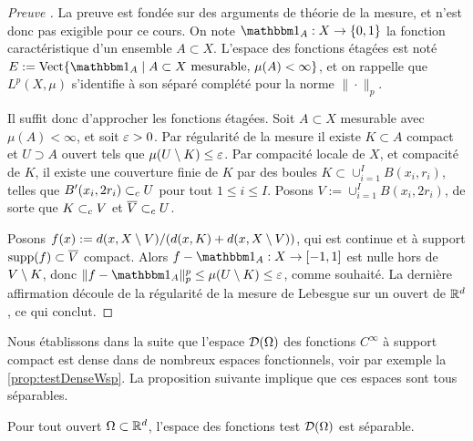 \begin{proof}[Preuve \facultatif] 
	La preuve est fondée sur des arguments de théorie de la mesure, et n'est donc pas exigible pour ce cours.
	On note $\bbone_A : X\to \{0,1\}$ la fonction caractéristique d'un ensemble $A\subset X$. 
	L'espace des fonctions étagées est noté $E := \Vect\{\bbone_A \mid A \subset X \text{ mesurable},\, \mu(A)<\infty \}$, et on rappelle que $L^p(X,\mu)$ s'identifie à son  séparé complété pour la norme $\|\cdot\|_p$. %
	
	Il suffit donc d'approcher les fonctions étagées.
	Soit $A \subset X$ mesurable avec $\mu(A) < \infty$, et soit $\varepsilon>0$. Par régularité de la mesure il existe $K \subset A$ compact et $U \supset A$ ouvert tels que $\mu(U\setminus K) \leq \varepsilon$. 
	Par compacité locale de $X$, et compacité de $K$, il existe une couverture finie de $K$ par des boules $K \subset \cup_{i=1}^I B(x_i,r_i)$, telles que $B'(x_i,2r_i)\subset_c U$ pour tout $1 \leq i \leq I$. Posons $V := \cup_{i=1}^I B(x_i,2r_i)$, de sorte que $K \subset_c V$ et $\overline V \subset_c U$.  
	
	
	Posons $f(x) := d(x,X\setminus V)/(d(x,K) + d(x,X\setminus V))$, qui est continue et à support $\operatorname{supp}(f) \subset \overline V$ compact. Alors $f-\bbone_A : X \to [-1,1]$ est nulle hors de $V\setminus K$, donc $\|f-\bbone_A\|_p^p \leq \mu(U\sm K) \leq \ve$, comme souhaité.
	La dernière affirmation découle de la régularité de la mesure de Lebesgue sur un ouvert de $\mathbb{R}^d$, ce qui conclut.
\end{proof}



Nous établissons dans la suite que l'espace $\mathcal{D}(\Omega)$ des fonctions $C^\infty$ à support compact est dense dans de nombreux espaces fonctionnels, voir par exemple la \cref{prop:testDenseWsp}.
La proposition suivante implique que ces espaces sont tous séparables. 

\begin{proposition}
\label{prop:testFunSeparab}	
%
	Pour tout ouvert $\Omega \subset \mathbb{R}^d$, l'espace des fonctions test $\mathcal{D}(\Omega)$ est séparable.
\end{proposition}

